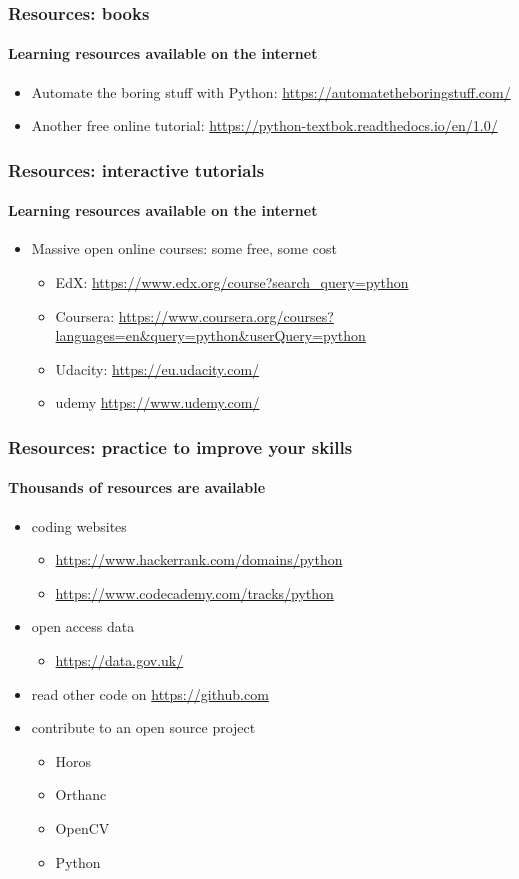 \documentclass{beamer}
\begin{document}
    \begin{frame}
	    \frametitle{Resources: books}
	    \framesubtitle{Learning resources available on the internet}
	    \begin{itemize}
		    \item Automate the boring stuff with Python: \url{https://automatetheboringstuff.com/}
		    \item Another free online tutorial: \url{https://python-textbok.readthedocs.io/en/1.0/}
	    \end{itemize}
    \end{frame}


    \begin{frame}
	    \frametitle{Resources: interactive tutorials}
	    \framesubtitle{Learning resources available on the internet}
	    \begin{itemize}
		    \item Massive open online courses: some free, some cost
			    \begin{itemize}
				    \item EdX: \url{https://www.edx.org/course?search_query=python}
				    \item Coursera: \url{https://www.coursera.org/courses?languages=en&query=python&userQuery=python}
				    \item Udacity: \url{https://eu.udacity.com/}
				    \item udemy \url{https://www.udemy.com/}
			    \end{itemize}
	    \end{itemize}
    \end{frame}

    \begin{frame}
	    \frametitle{Resources: practice to improve your skills}
	    \framesubtitle{Thousands of resources are available}
	    \begin{itemize}
		    \item coding websites
			    \begin{itemize}
				    \item \url{https://www.hackerrank.com/domains/python}
				    \item \url{https://www.codecademy.com/tracks/python}
			    \end{itemize}
		    \item open access data
			    \begin{itemize}
				    \item \url{https://data.gov.uk/}
			    \end{itemize}
		    \item read other code on \url{https://github.com}
		    \item contribute to an open source project
			    \begin{itemize}
				    \item Horos
				    \item Orthanc
				    \item OpenCV
				    \item Python
			    \end{itemize}
	    \end{itemize}
    \end{frame}
\end{document}
